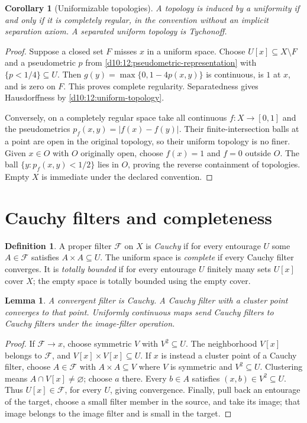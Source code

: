 \documentclass[11pt,oneside,openany]{book}
\newtheorem{lemma}[theorem]{Lemma}
\newtheorem{corollary}[theorem]{Corollary}
\theoremstyle{definition}
\newtheorem{definition}[theorem]{Definition}
\theoremstyle{remark}
\begin{document}
\begin{corollary}[Uniformizable topologies]\label{d10:12:uniformizable}
A topology is induced by a uniformity if and only if it is completely regular, in the convention without an implicit separation axiom. A separated uniform topology is Tychonoff.
\end{corollary}
\begin{proof}
Suppose a closed set $F$ misses $x$ in a uniform space. Choose $U[x]\subseteq X\setminus F$ and a pseudometric $p$ from \cref{d10:12:pseudometric-representation} with $\{p<1/4\}\subseteq U$. Then $g(y)=\max\{0,1-4p(x,y)\}$ is continuous, is $1$ at $x$, and is zero on $F$. This proves complete regularity. Separatedness gives Hausdorffness by \cref{d10:12:uniform-topology}.

Conversely, on a completely regular space take all continuous $f:X\to[0,1]$ and the pseudometrics $p_f(x,y)=|f(x)-f(y)|$. Their finite-intersection balls at a point are open in the original topology, so their uniform topology is no finer. Given $x\in O$ with $O$ originally open, choose $f(x)=1$ and $f=0$ outside $O$. The ball $\{y:p_f(x,y)<1/2\}$ lies in $O$, proving the reverse containment of topologies. Empty $X$ is immediate under the declared convention.
\end{proof}

\section{Cauchy filters and completeness}

\begin{definition}\label{d10:12:cauchy}
A proper filter $\mathcal F$ on $X$ is \emph{Cauchy} if for every entourage $U$ some $A\in\mathcal F$ satisfies $A\times A\subseteq U$. The uniform space is \emph{complete} if every Cauchy filter converges. It is \emph{totally bounded} if for every entourage $U$ finitely many sets $U[x]$ cover $X$; the empty space is totally bounded using the empty cover.
\end{definition}

\begin{lemma}\label{d10:12:cauchy-cluster}
A convergent filter is Cauchy. A Cauchy filter with a cluster point converges to that point. Uniformly continuous maps send Cauchy filters to Cauchy filters under the image-filter operation.
\end{lemma}
\begin{proof}
If $\mathcal F\to x$, choose symmetric $V$ with $V^2\subseteq U$. The neighborhood $V[x]$ belongs to $\mathcal F$, and $V[x]\times V[x]\subseteq U$. If $x$ is instead a cluster point of a Cauchy filter, choose $A\in\mathcal F$ with $A\times A\subseteq V$ where $V$ is symmetric and $V^2\subseteq U$. Clustering means $A\cap V[x]\ne\varnothing$; choose $a$ there. Every $b\in A$ satisfies $(x,b)\in V^2\subseteq U$. Thus $U[x]\in\mathcal F$, for every $U$, giving convergence. Finally, pull back an entourage of the target, choose a small filter member in the source, and take its image; that image belongs to the image filter and is small in the target.
\end{proof}
\end{document}
